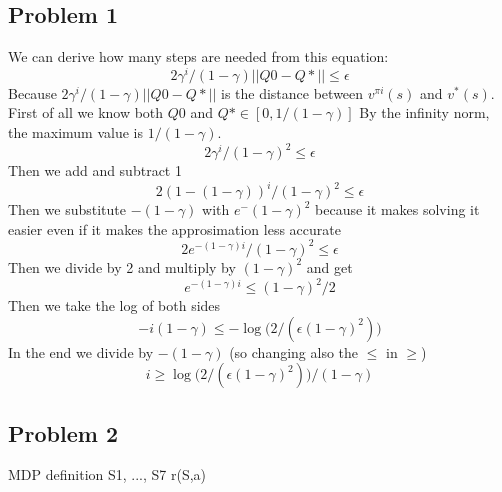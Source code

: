 \documentclass[10pt,a4paper]{article}
\begin{document}
\subsection*{Problem 1}
We can derive how many steps are needed from this equation:
\begin{equation}  {2\gamma^i}/{(1-\gamma)}||Q0-Q*|| \leq \epsilon \end{equation}
Because $ {2\gamma^i}/{(1-\gamma)}||Q0-Q*|| $ is the distance between $ v^{\pi i}(s) $ and $v^*(s) $. \newline
\newline
First of all we know both $Q0$ and $Q* \in [0, 1/(1-\gamma)]$ By the infinity norm, the maximum value is $ 1/(1-\gamma) $. 
\begin{equation}
{2\gamma^i}/{(1-\gamma)^2} \leq \epsilon
\end{equation}
Then we add and subtract 1 
\begin{equation}
    {2 (1 - (1 - \gamma))^i}/{(1-\gamma)^2} \leq \epsilon
\end{equation}
Then we substitute $ - (1 - \gamma) $ with $e^- (1 - \gamma)^2 $ because it makes solving it easier even if it makes the approsimation less accurate
\begin{equation}
    {2e^{-(1 - \gamma )i}}/{(1-\gamma)^2} \leq \epsilon
\end{equation}
Then we divide by 2 and multiply by $ {(1-\gamma)^2} $ and get 
\begin{equation}
e^{-(1 - \gamma )i} \leq  {(1-\gamma)^2}/2
\end{equation}
Then we take the log of both sides 
\begin{equation}
    -i(1 - \gamma ) \leq  -\log({2/(\epsilon(1-\gamma)^2))}
\end{equation}
In the end we divide by $ -(1 - \gamma ) $ (so changing also the $\leq$ in $\geq$)
\begin{equation}
    i \geq  \log({2/(\epsilon(1-\gamma)^2))}/(1 - \gamma ) 
\end{equation}

\newpage
\subsection*{Problem 2}
MDP definition \newline
S1, ..., S7 \newline
r(S,a)
\end{document}
